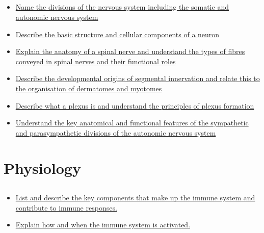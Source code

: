 \documentclass[10pt, a4paper]{article}
\begin{document}
\subsection{} \begin{itemize} \item \href{https://www.notion.so/b7c66e2a10b64344948847c5eec9eaab}{Name the divisions of the nervous system including the somatic
and autonomic nervous system} \item \href{https://www.notion.so/0fe33dd3100f49d0af140b616028b546}{Describe the basic structure and cellular components of a neuron} \item \href{https://www.notion.so/634f2d48602a44ccaafc9feda269d2c9}{Explain the anatomy of a spinal nerve and understand the types of fibres conveyed in spinal nerves and their functional roles} \item \href{https://www.notion.so/c0ba5694371e47c9a8aeda766944e15e}{Describe the developmental origins of segmental innervation and relate this to the organisation of dermatomes and myotomes} \item \href{https://www.notion.so/92a77a2882034bc1b5adbf0b5d62b72d}{Describe what a plexus is and understand the principles of
plexus formation} \item \href{https://www.notion.so/d989a3be38ae4e30b02d0dbcd8635a30}{Understand the key anatomical and functional features of the sympathetic and parasympathetic divisions of the autonomic nervous system} \end{itemize}
\section{Physiology}
\subsection{} \begin{itemize} \item \href{https://www.notion.so/874304e034cf40ff93246433d687fc8b}{List and describe the key components that make up the immune system and contribute to immune responses.} \item \href{https://www.notion.so/16c8ef0eea6a4039a01468f9da51dcc8}{Explain how and when the immune system is activated.} \end{itemize}
\end{document}
